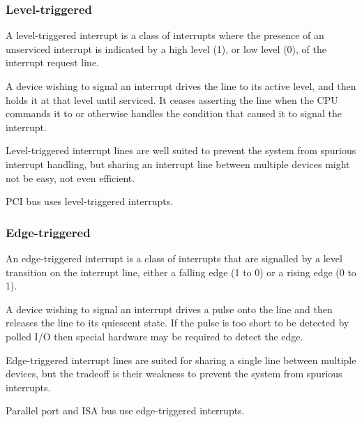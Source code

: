 \begin{frame}
  \frametitle{Level-triggered}

A level-triggered interrupt is a class of interrupts where the presence of an unserviced interrupt is indicated by a high level (1), or low level (0), of the interrupt request line.

\-

A device wishing to signal an interrupt drives the line to its active level, and then holds it at that level until serviced. It ceases asserting the line when the CPU commands it to or otherwise handles the condition that caused it to signal the interrupt.

\-

Level-triggered interrupt lines are well suited to prevent the system from spurious interrupt handling, but sharing an interrupt line between multiple devices might not be easy, not even efficient.

\-

PCI bus uses level-triggered interrupts. 

\end{frame}


\begin{frame}
  \frametitle{Edge-triggered}

An edge-triggered interrupt is a class of interrupts that are signalled by a level transition on the interrupt line, either a falling edge (1 to 0) or a rising edge (0 to 1).

\-

 A device wishing to signal an interrupt drives a pulse onto the line and then releases the line to its quiescent state. If the pulse is too short to be detected by polled I/O then special hardware may be required to detect the edge.

\-

 Edge-triggered interrupt lines are suited for sharing a single line between multiple devices, but the tradeoff is their weakness to prevent the system from spurious interrupts.

\-

Parallel port and ISA bus use edge-triggered interrupts.

\end{frame}


